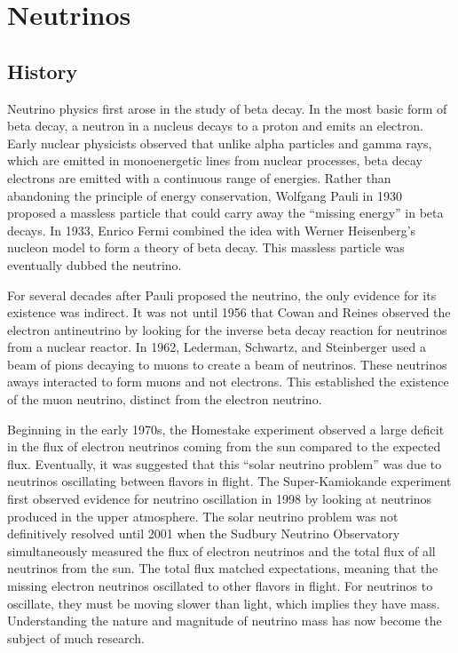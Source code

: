 \documentclass[herrin-thesis.tex]{subfiles}
\begin{document}
\chapter{Neutrinos}
\label{ch:neutrinos}

\section{History}
Neutrino physics first arose in the study of beta decay. In the most basic form of beta decay, a neutron in a nucleus decays to a proton and emits an electron. Early nuclear physicists observed that unlike alpha particles and gamma rays, which are emitted in monoenergetic lines from nuclear processes, beta decay electrons are emitted with a continuous range of energies. Rather than abandoning the principle of energy conservation, Wolfgang Pauli in 1930 proposed a massless particle that could carry away the ``missing energy'' in beta decays. In 1933, Enrico Fermi\cite{Fermi:1934bh} combined the idea with Werner Heisenberg's nucleon model to form a theory of beta decay. This massless particle was eventually dubbed the neutrino.

For several decades after Pauli proposed the neutrino, the only evidence for its existence was indirect. It was not until 1956 that Cowan and Reines\cite{Cowan:1956qf} observed the electron antineutrino by looking for the inverse beta decay reaction for neutrinos from a nuclear reactor. In 1962, Lederman, Schwartz, and Steinberger\cite{Danby:1962ve} used a beam of pions decaying to muons to create a beam of neutrinos. These neutrinos aways interacted to form muons and not electrons. This established the existence of the muon neutrino, distinct from the electron neutrino.

Beginning in the early 1970s, the Homestake experiment\cite{Cleveland:1998ly} observed a large deficit in the flux of electron neutrinos coming from the sun compared to the expected flux. Eventually, it was suggested that this ``solar neutrino problem'' was due to neutrinos oscillating between flavors in flight. The Super-Kamiokande experiment first observed evidence for neutrino oscillation in 1998\cite{Fukuda:1998zr} by looking at neutrinos produced in the upper atmosphere. The solar neutrino problem was not definitively resolved until 2001 when the Sudbury Neutrino Observatory\cite{Ahmad:2001ys} simultaneously measured the flux of electron neutrinos and the total flux of all neutrinos from the sun. The total flux matched expectations, meaning that the missing electron neutrinos oscillated to other flavors in flight. For neutrinos to oscillate, they must be moving slower than light, which implies they have mass. Understanding the nature and magnitude of neutrino mass has now become the subject of much research.
\end{document}
